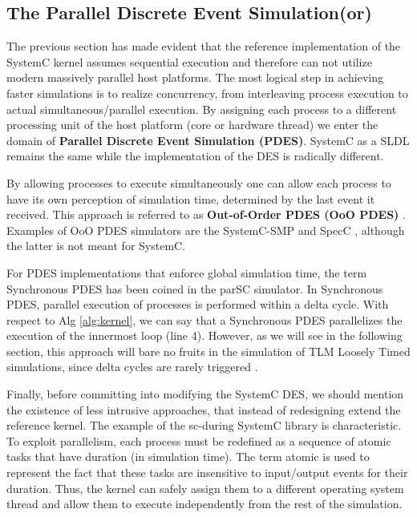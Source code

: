 \documentclass[12pt,twoside]{article}
\begin{document}
\subsection{The Parallel Discrete Event Simulation(or)}
\label{sec:orgheadline6}
The previous section has made evident that the reference implementation of the SystemC kernel assumes sequential execution and therefore can not utilize modern massively parallel host platforms. 
The most logical step in achieving faster simulations is to realize concurrency, from interleaving process execution to actual simultaneous/parallel execution.
By assigning each process to a different processing unit of the host platform (core or hardware thread) we enter the domain of \textbf{Parallel Discrete Event Simulation (PDES)}.
SystemC as a SLDL remains the same while the implementation of the DES is radically different.

By allowing processes to execute simultaneously one can allow each process to have its own perception of simulation time, determined by the last event it received.
This approach is referred to as \textbf{Out-of-Order PDES (OoO PDES)} \cite{Chen2015}.
Examples of OoO PDES simulators are the SystemC-SMP \cite{Mello2010} and SpecC \cite{Domer2011}, although the latter is not meant for SystemC.

For PDES implementations that enforce global simulation time, the term Synchronous PDES has been coined in the parSC simulator\cite{Schumacher2010}.
In Synchronous PDES, parallel execution of processes is performed within a delta cycle. 
With respect to Alg \ref{alg:kernel}, we can say that a Synchronous PDES parallelizes the execution of the innermost loop (line 4).
However, as we will see in the following section, this approach will bare no fruits in the simulation of TLM Loosely Timed simulations, since delta cycles are rarely triggered \cite{Chen2012}.

Finally, before committing into modifying the SystemC DES, we should mention the existence of less intrusive approaches, that instead of redesigning extend the reference kernel.
The example of the sc-during SystemC library \cite{Moy} is characteristic. 
To exploit parallelism, each process must be redefined as a sequence of atomic tasks that have duration (in simulation time).
The term atomic is used to represent the fact that these tasks are insensitive to input/output events for their duration.
Thus, the kernel can safely assign them to a different operating system thread and allow them to execute independently from the rest of the simulation.
\end{document}
